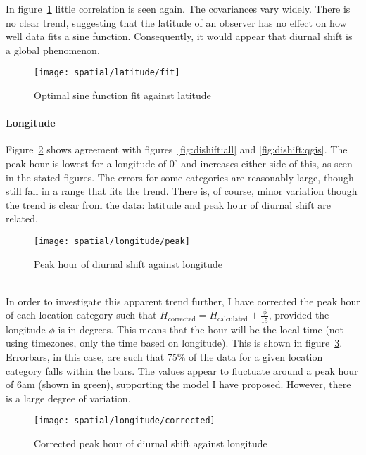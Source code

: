 In figure~\ref{fig:dishift:lat:fit} little correlation is seen again. The covariances vary widely. There is no clear trend, suggesting that the latitude of an observer has no effect on how well data fits a sine function. Consequently, it would appear that diurnal shift is a global phenomenon.
\begin{figure}[h!]
	\centering
	\texttt{[image: spatial/latitude/fit]}
	\caption{Optimal sine function fit against latitude
		\label{fig:dishift:lat:fit}}
\end{figure}

\paragraph{Longitude\\}
Figure~\ref{fig:dishift:lon:peak} shows agreement with figures~\ref{fig:dishift:all} and \ref{fig:dishift:qgis}. The peak hour is lowest for a longitude of $0^{\circ}$ and increases either side of this, as seen in the stated figures. The errors for some categories are reasonably large, though still fall in a range that fits the trend. There is, of course, minor variation though the trend is clear from the data: latitude and peak hour of diurnal shift are related.
\begin{figure}[h!]
	\centering
	\texttt{[image: spatial/longitude/peak]}
	\caption{Peak hour of diurnal shift against longitude
		\label{fig:dishift:lon:peak}}
\end{figure}\\
In order to investigate this apparent trend further, I have corrected the peak hour of each location category such that $H_{\text{corrected}} = H_{\text{calculated}} + \frac{\phi}{15}$, provided the longitude $\phi$ is in degrees. This means that the hour will be the local time (not using timezones, only the time based on longitude). This is shown in figure~\ref{fig:dishift:lon:corrected}. Errorbars, in this case, are such that 75\% of the data for a given location category falls within the bars. The values appear to fluctuate around a peak hour of 6am (shown in green), supporting the model I have proposed. However, there is a large degree of variation.
\begin{figure}[h!]
	\centering
	\texttt{[image: spatial/longitude/corrected]}
	\caption{Corrected peak hour of diurnal shift against longitude
		\label{fig:dishift:lon:corrected}}
\end{figure}\\
